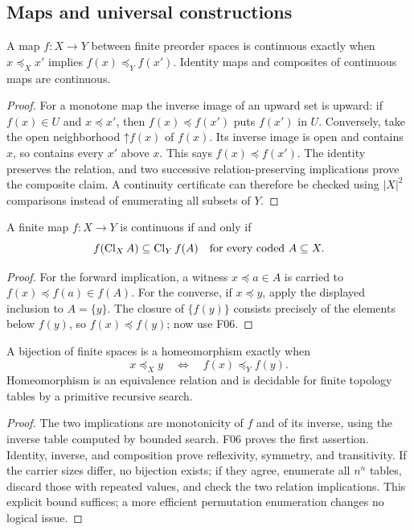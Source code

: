 \subsection{Maps and universal constructions}

\begin{theorem}\label{thm:finite-cont}
A map $f:X\to Y$ between finite preorder spaces is continuous
exactly when $x\preceq_X x'$ implies $f(x)\preceq_Y f(x')$.
Identity maps and composites of continuous maps are continuous.
\end{theorem}
\begin{proof}
For a monotone map the inverse image of an upward set is upward:
if $f(x)\in U$ and $x\preceq x'$, then
$f(x)\preceq f(x')$ puts $f(x')$ in $U$.
Conversely, take the open neighborhood
$\mathord\uparrow f(x)$ of $f(x)$.  Its inverse image is open
and contains $x$, so contains every $x'$ above $x$.  This says
$f(x)\preceq f(x')$.  The identity preserves the relation, and
two successive relation-preserving implications prove the composite
claim.  A continuity certificate can therefore be checked using
$|X|^2$ comparisons instead of enumerating all subsets of $Y$.
\end{proof}

\begin{theorem}\label{thm:finite-closuremap}
A finite map $f:X\to Y$ is continuous if and only if
\[
 f(\operatorname{Cl}_X A)\subseteq\operatorname{Cl}_Y f(A)
 \quad\hbox{for every coded }A\subseteq X.
\]
\end{theorem}
\begin{proof}
For the forward implication, a witness $x\preceq a\in A$
is carried to $f(x)\preceq f(a)\in f(A)$.
For the converse, if $x\preceq y$, apply the displayed inclusion
to $A=\{y\}$.  The closure of $\{f(y)\}$ consists precisely of
the elements below $f(y)$, so $f(x)\preceq f(y)$; now use F06.
\end{proof}

\begin{theorem}\label{thm:finite-homeo}
A bijection of finite spaces is a homeomorphism exactly when
\[
 x\preceq_X y\quad\Longleftrightarrow\quad f(x)\preceq_Y f(y).
\]
Homeomorphism is an equivalence relation and is decidable for finite
topology tables by a primitive recursive search.
\end{theorem}
\begin{proof}
The two implications are monotonicity of $f$ and of its inverse,
using the inverse table computed by bounded search.  F06 proves the
first assertion.  Identity, inverse, and composition prove
reflexivity, symmetry, and transitivity.  If the carrier sizes differ,
no bijection exists; if they agree, enumerate all $n^n$ tables,
discard those with repeated values, and check the two relation
implications.  This explicit bound suffices; a more efficient
permutation enumeration changes no logical issue.
\end{proof}

